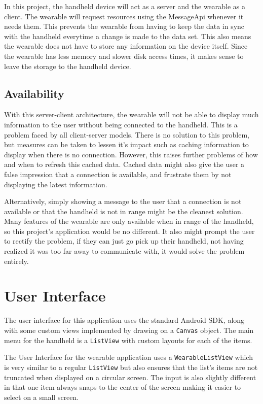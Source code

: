 In this project, the handheld device will act as a server and the wearable as a
client. The wearable will request resources using the MessageApi whenever it
needs them. This prevents the wearable from having to keep the data in sync with
the handheld everytime a change is made to the data set. This also means the
wearable does not have to store any information on the device itself. Since the
wearable has less memory and slower disk access times, it makes sense to leave
the storage to the handheld device.

\subsection{Availability}

With this server-client architecture, the wearable will not be able to display
much information to the user without being connected to the handheld. This is
a problem faced by all client-server models. There is no solution to this
problem, but measures can be taken to lessen it's impact such as caching
information to display when there is no connection. However, this raises further
problems of how and when to refresh this cached data. Cached data might also
give the user a false impression that a connection is available, and frustrate
them by not displaying the latest information.

Alternatively, simply showing a message to the user that a connection is not
available or that the handheld is not in range might be the cleanest solution.
Many features of the wearable are only available when in range of the handheld,
so this project's application would be no different. It also might prompt the
user to rectify the problem, if they can just go pick up their handheld, not
having realized it was too far away to communicate with, it would solve the
problem entirely.

\section{User Interface}

The user interface for this application uses the standard Android SDK, along
with some custom views implemented by drawing on a \texttt{Canvas} object.
The main menu for the handheld is a \texttt{ListView} with custom layouts
for each of the items.

The User Interface for the wearable application uses a \texttt{WearableListView}
which is very similar to a regular \texttt{ListView} but also ensures that the
list's items are not truncated when displayed on a circular screen. The input
is also slightly different in that one item always snaps to the center of the
screen making it easier to select on a small screen.

